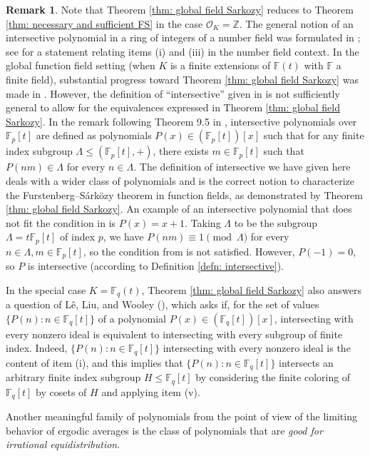 \documentclass{amsart}
\theoremstyle{definition}
\newtheorem{remark}[theorem]{Remark}
\numberwithin{equation}{section}
\newcommand{\Z}{\mathbb{Z}}
\newcommand{\F}{\mathbb{F}}
\newcommand{\mO}{\mathcal{O}}
\begin{document}
\begin{remark}
    Note that Theorem \ref{thm: global field Sarkozy} reduces to Theorem \ref{thm: necessary and sufficient FS} in the case $\mO_K = \Z$.
    The general notion of an intersective polynomial in a ring of integers of a number field was formulated in \cite{br}; see \cite[Theorem 1.17]{br} for a statement relating items (i) and (iii) in the number field context.
    In the global function field setting (when $K$ is a finite extensions of $\F(t)$ with $\F$ a finite field), substantial progress toward Theorem \ref{thm: global field Sarkozy} was made in \cite{bl}.
    However, the definition of ``intersective'' given in \cite{bl} is not sufficiently general to allow for the equivalences expressed in Theorem \ref{thm: global field Sarkozy}.
    In the remark following Theorem 9.5 in \cite{bl}, intersective polynomials over $\F_p[t]$ are defined as polynomials $P(x) \in (\F_p[t])[x]$ such that for any finite index subgroup $\Lambda \le (\F_p[t], +)$, there exists $m \in \F_p[t]$ such that $P(nm) \in \Lambda$ for every $n \in \Lambda$.
	The definition of intersective we have given here deals with a wider class of polynomials and is the correct notion to characterize the Furstenberg--S\'{a}rk\"{o}zy theorem in function fields, as demonstrated by Theorem \ref{thm: global field Sarkozy}.
	An example of an intersective polynomial that does not fit the condition in \cite{bl} is $P(x) = x+1$.
	Taking $\Lambda$ to be the subgroup $\Lambda = t\F_p[t]$ of index $p$, we have $P(nm) \equiv 1 \pmod{\Lambda}$ for every $n \in \Lambda, m \in \F_p[t]$, so the condition from \cite{bl} is not satisfied.
	However, $P(-1) = 0$, so $P$ is intersective (according to Definition \ref{defn: intersective}).

    In the special case $K = \F_q(t)$, Theorem \ref{thm: global field Sarkozy} also answers a question of L\^{e}, Liu, and Wooley (\cite[Question 1]{llw}), which asks if, for the set of values $\{P(n) : n \in \F_q[t]\}$ of a polynomial $P(x) \in (\F_q[t])[x]$, intersecting with every nonzero ideal is equivalent to intersecting with every subgroup of finite index.
    Indeed, $\{P(n) : n \in \F_q[t]\}$ intersecting with every nonzero ideal is the content of item (i), and this implies that $\{P(n) : n \in \F_q[t]\}$ intersects an arbitrary finite index subgroup $H \le \F_q[t]$ by considering the finite coloring of $\F_q[t]$ by cosets of $H$ and applying item (v).
\end{remark}

Another meaningful family of polynomials from the point of view of the limiting behavior of ergodic averages is the class of polynomials that are \emph{good for irrational equidistribution}.
\end{document}
